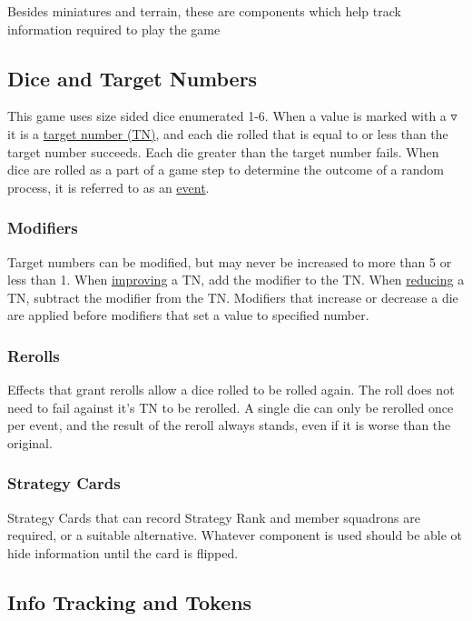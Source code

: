 Besides miniatures and terrain, these are components which help track information required to play the game

\subsection{Dice and Target Numbers}
This game uses size sided dice enumerated 1-6. When a value is marked with a $\triangledown$ it is a \underline{target number (TN)}, and each die rolled that is equal to or less than the target number succeeds. Each die greater than the target number fails. When dice are rolled as a part of a game step to determine the outcome of a random process, it is referred to as an \underline{event}.

\subsubsection{Modifiers}
Target numbers can be modified, but may never be increased to more than 5 or less than 1. When \underline{improving} a TN, add the modifier to the TN. When \underline{reducing} a TN, subtract the modifier from the TN. Modifiers that increase or decrease a die are applied before modifiers that set a value to specified number.

\subsubsection{Rerolls}
Effects that grant rerolls allow a dice rolled to be rolled again. The roll does not need to fail against it's TN to be rerolled. A single die can only be rerolled once per event, and the result of the reroll always stands, even if it is worse than the original.

\subsubsection{Strategy Cards}
Strategy Cards that can record Strategy Rank and member squadrons are required, or a suitable alternative. Whatever component is used should be able ot hide information until the card is flipped.

\subsection{Info Tracking and Tokens}
